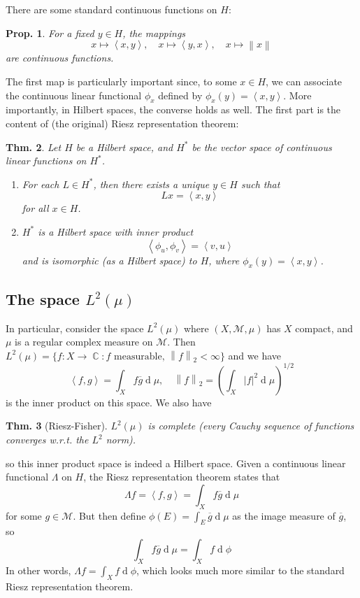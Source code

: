 \documentclass[12pt, a4paper]{book}
\DeclareMathOperator{\C}{\mathbb{C}}
\renewcommand{\d}[1]{\ensuremath{\operatorname{d}\!{#1}}} %
\newcommand{\inner}[2]{\left\langle #1, #2 \right\rangle} %
\newcommand{\norm}[1]{\left\lVert#1\right\rVert} %
\newtheorem{theorem}{Thm.}[section]
\newtheorem{proposition}[theorem]{Prop.}
\theoremstyle{nonumberplain}
\begin{document}
There are some standard continuous functions on $H$:
\begin{proposition}
    For a fixed $y\in H$, the mappings
    \[x\mapsto\inner{x}{y},\quad x\mapsto\inner{y}{x},\quad x\mapsto\norm{x}\]
    are continuous functions.
\end{proposition}
The first map is particularly important since, to some $x\in H$, we can associate the continuous linear functional $\phi_x$ defined by $\phi_x(y)=\inner{x}{y}$.
More importantly, in Hilbert spaces, the converse holds as well.
The first part is the content of (the original) Riesz representation theorem:
\begin{theorem}
    Let $H$ be a Hilbert space, and $H^*$ be the vector space of continuous linear functions on $H^*$.
    \begin{enumerate}[nolistsep]
        \item For each $L\in H^*$, then there exists a unique $y\in H$ such that
            \[Lx=\inner{x}{y}\]
            for all $x\in H$.
        \item $H^*$ is a Hilbert space with inner product
            \[\inner{\phi_u}{\phi_v}=\inner{v}{u}\]
            and is isomorphic (as a Hilbert space) to $H$, where $\phi_x(y)=\inner{x}{y}$.
    \end{enumerate}
\end{theorem}
\subsection{The space $L^2(\mu)$}
In particular, consider the space $L^2(\mu)$ where $(X,\mathcal{M},\mu)$ has $X$ compact, and $\mu$ is a regular complex measure on $\mathcal{M}$.
Then $L^2(\mu)=\{f:X\to\C:f\text{ measurable, }\norm{f}_2<\infty\}$ and we have
\[\inner{f}{g}=\int_Xf\overline{g}\d{\mu},\quad\norm{f}_2=\left(\int_X |f|^2\d{\mu}\right)^{1/2}\]
is the inner product on this space.
We also have
\begin{theorem}[Riesz-Fisher]
    $L^2(\mu)$ is complete (every Cauchy sequence of functions converges w.r.t. the $L^2$ norm).
\end{theorem}
so this inner product space is indeed a Hilbert space.
Given a continuous linear functional $\Lambda$ on $H$, the Riesz representation theorem states that
\[\Lambda f=\inner{f}{g}=\int_X f\overline{g}\d{\mu}\]
for some $g\in\mathcal{M}$.
But then define $\phi(E)=\int_E\overline{g}\d{\mu}$ as the image measure of $\overline{g}$, so
\[\int_Xf\overline{g}\d{\mu}=\int_X f\d{\phi}\]
In other words, $\Lambda f=\int_Xf\d{\phi}$, which looks much more similar to the standard Riesz representation theorem.
\end{document}
